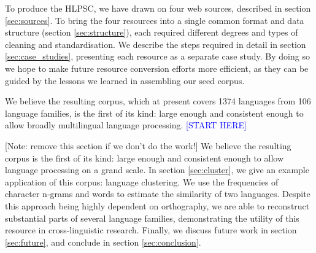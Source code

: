 To produce the HLPSC, we have drawn on four web sources, described in section \ref{sec:sources}. To bring the four resources into a single common format and data structure (section \ref{sec:structure}), each required different degrees and types of cleaning and standardisation. We describe the steps required in detail in section \ref{sec:case_studies}, presenting each resource as a separate case study. By doing so we hope to make future resource conversion efforts more efficient, as they can be guided by the lessons we learned in assembling our seed corpus. 

We believe the resulting corpus, which at present covers 1374 languages from 106 language families, is the first of its kind: large enough and consistent enough to allow broadly multilingual language processing. \textcolor{blue}{[START HERE]}


[Note: remove this section if we don't do the work!] We believe the resulting corpus is the first of its kind: large enough and consistent enough to allow language processing on a grand scale. In section \ref{sec:cluster}, we give an example application of this corpus: language clustering. We use the frequencies of character n-grams and words to estimate the similarity of two languages. Despite this approach being highly dependent on orthography, we are able to reconstruct substantial parts of several language families, demonstrating the utility of this resource in cross-linguistic research. Finally, we discuss future work in section \ref{sec:future}, and conclude in section \ref{sec:conclusion}.


